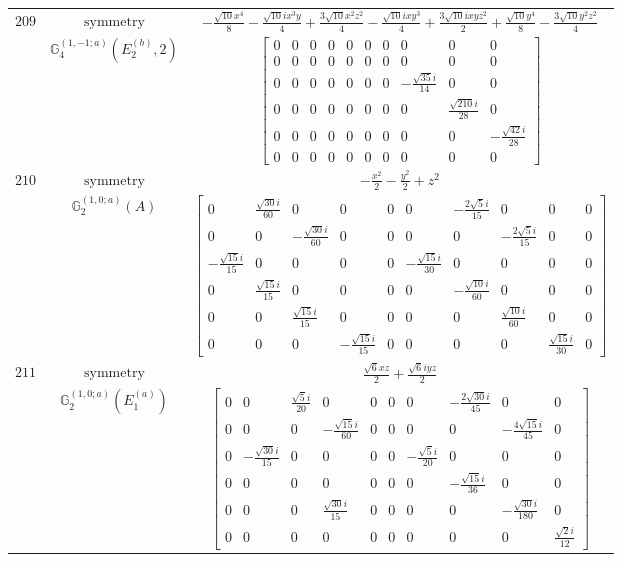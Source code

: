 \documentclass[fleqn,8pt,landscape]{jsarticle}
\begin{document}
\begin{longtable}{ccc}
$ 209 $ & $ \text{symmetry} $ & $ - \frac{\sqrt{10} x^{4}}{8} - \frac{\sqrt{10} i x^{3} y}{4} + \frac{3 \sqrt{10} x^{2} z^{2}}{4} - \frac{\sqrt{10} i x y^{3}}{4} + \frac{3 \sqrt{10} i x y z^{2}}{2} + \frac{\sqrt{10} y^{4}}{8} - \frac{3 \sqrt{10} y^{2} z^{2}}{4} $ \\
$  $ & $ \mathbb{G}_{4}^{(1,-1;a)}(E_{2}^{(b)},2) $ & $ \begin{bmatrix} 0 & 0 & 0 & 0 & 0 & 0 & 0 & 0 & 0 & 0 \\ 0 & 0 & 0 & 0 & 0 & 0 & 0 & 0 & 0 & 0 \\ 0 & 0 & 0 & 0 & 0 & 0 & 0 & - \frac{\sqrt{35} i}{14} & 0 & 0 \\ 0 & 0 & 0 & 0 & 0 & 0 & 0 & 0 & \frac{\sqrt{210} i}{28} & 0 \\ 0 & 0 & 0 & 0 & 0 & 0 & 0 & 0 & 0 & - \frac{\sqrt{42} i}{28} \\ 0 & 0 & 0 & 0 & 0 & 0 & 0 & 0 & 0 & 0 \end{bmatrix} $ \\ \hline
$ 210 $ & $ \text{symmetry} $ & $ - \frac{x^{2}}{2} - \frac{y^{2}}{2} + z^{2} $ \\
$  $ & $ \mathbb{G}_{2}^{(1,0;a)}(A) $ & $ \begin{bmatrix} 0 & \frac{\sqrt{30} i}{60} & 0 & 0 & 0 & 0 & - \frac{2 \sqrt{5} i}{15} & 0 & 0 & 0 \\ 0 & 0 & - \frac{\sqrt{30} i}{60} & 0 & 0 & 0 & 0 & - \frac{2 \sqrt{5} i}{15} & 0 & 0 \\ - \frac{\sqrt{15} i}{15} & 0 & 0 & 0 & 0 & - \frac{\sqrt{15} i}{30} & 0 & 0 & 0 & 0 \\ 0 & \frac{\sqrt{15} i}{15} & 0 & 0 & 0 & 0 & - \frac{\sqrt{10} i}{60} & 0 & 0 & 0 \\ 0 & 0 & \frac{\sqrt{15} i}{15} & 0 & 0 & 0 & 0 & \frac{\sqrt{10} i}{60} & 0 & 0 \\ 0 & 0 & 0 & - \frac{\sqrt{15} i}{15} & 0 & 0 & 0 & 0 & \frac{\sqrt{15} i}{30} & 0 \end{bmatrix} $ \\ \hline
$ 211 $ & $ \text{symmetry} $ & $ \frac{\sqrt{6} x z}{2} + \frac{\sqrt{6} i y z}{2} $ \\
$  $ & $ \mathbb{G}_{2}^{(1,0;a)}(E_{1}^{(a)}) $ & $ \begin{bmatrix} 0 & 0 & \frac{\sqrt{5} i}{20} & 0 & 0 & 0 & 0 & - \frac{2 \sqrt{30} i}{45} & 0 & 0 \\ 0 & 0 & 0 & - \frac{\sqrt{15} i}{60} & 0 & 0 & 0 & 0 & - \frac{4 \sqrt{15} i}{45} & 0 \\ 0 & - \frac{\sqrt{30} i}{15} & 0 & 0 & 0 & 0 & - \frac{\sqrt{5} i}{20} & 0 & 0 & 0 \\ 0 & 0 & 0 & 0 & 0 & 0 & 0 & - \frac{\sqrt{15} i}{36} & 0 & 0 \\ 0 & 0 & 0 & \frac{\sqrt{30} i}{15} & 0 & 0 & 0 & 0 & - \frac{\sqrt{30} i}{180} & 0 \\ 0 & 0 & 0 & 0 & 0 & 0 & 0 & 0 & 0 & \frac{\sqrt{2} i}{12} \end{bmatrix} $ \\ \hline

\end{longtable}
\end{document}
